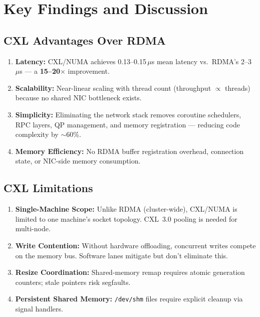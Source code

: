 \documentclass[11pt,a4paper]{article}
\begin{document}
\section{Key Findings and Discussion}

\subsection{CXL Advantages Over RDMA}

\begin{enumerate}[nosep]
  \item \textbf{Latency:} CXL/NUMA achieves 0.13--0.15\,$\mu$s mean latency vs.\ RDMA's 2--3\,$\mu$s --- a \textbf{15--20$\times$} improvement.
  \item \textbf{Scalability:} Near-linear scaling with thread count (throughput $\propto$ threads) because no shared NIC bottleneck exists.
  \item \textbf{Simplicity:} Eliminating the network stack removes coroutine schedulers, RPC layers, QP management, and memory registration --- reducing code complexity by $\sim$60\%.
  \item \textbf{Memory Efficiency:} No RDMA buffer registration overhead, connection state, or NIC-side memory consumption.
\end{enumerate}

\subsection{CXL Limitations}

\begin{enumerate}[nosep]
  \item \textbf{Single-Machine Scope:} Unlike RDMA (cluster-wide), CXL/NUMA is limited to one machine's socket topology. CXL~3.0 pooling is needed for multi-node.
  \item \textbf{Write Contention:} Without hardware offloading, concurrent writes compete on the memory bus. Software lanes mitigate but don't eliminate this.
  \item \textbf{Resize Coordination:} Shared-memory remap requires atomic generation counters; stale pointers risk segfaults.
  \item \textbf{Persistent Shared Memory:} \texttt{/dev/shm} files require explicit cleanup via signal handlers.
\end{enumerate}
\end{document}
